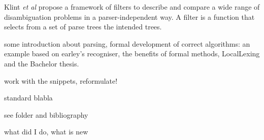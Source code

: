 \begin{isabellebody}
\begin{isamarkuptext}
Klint \textit{et al} \cite{Klint:1997} propose a framework of filters to describe and compare a wide
range of disambiguation problems in a parser-independent way. A filter is a function that selects
from a set of parse trees the intended trees.%
\end{isamarkuptext}\isamarkuptrue%
%
\isadelimdocument
%
\endisadelimdocument
%
\isatagdocument
%
\isamarkuptrue%
%
\isamarkuptrue%
%
\endisatagdocument
{\isafolddocument}%
%
\isadelimdocument
%
\endisadelimdocument
%
\begin{isamarkuptext}%
some introduction about parsing, formal development of correct algorithms: an example based on
earley's recogniser, the benefits of formal methods, LocalLexing and the Bachelor thesis.%
\end{isamarkuptext}\isamarkuptrue%
%
\begin{isamarkuptext}%
work with the snippets, reformulate!%
\end{isamarkuptext}\isamarkuptrue%
%
\isadelimdocument
%
\endisadelimdocument
%
\isatagdocument
%
\isamarkuptrue%
%
\endisatagdocument
{\isafolddocument}%
%
\isadelimdocument
%
\endisadelimdocument
%
\begin{isamarkuptext}%
standard blabla%
\end{isamarkuptext}\isamarkuptrue%
%
\isadelimdocument
%
\endisadelimdocument
%
\isatagdocument
%
\isamarkuptrue%
%
\endisatagdocument
{\isafolddocument}%
%
\isadelimdocument
%
\endisadelimdocument
%
\begin{isamarkuptext}%
see folder and bibliography%
\end{isamarkuptext}\isamarkuptrue%
%
\isadelimdocument
%
\endisadelimdocument
%
\isatagdocument
%
\isamarkuptrue%
%
\endisatagdocument
{\isafolddocument}%
%
\isadelimdocument
%
\endisadelimdocument
%
\begin{isamarkuptext}%
what did I do, what is new%
\end{isamarkuptext}\isamarkuptrue%
%
\isadelimtheory
%
\endisadelimtheory
%
\isatagtheory
%
\endisatagtheory
{\isafoldtheory}%
%
\isadelimtheory
%
\endisadelimtheory
%
\end{isabellebody}%
\endinput

